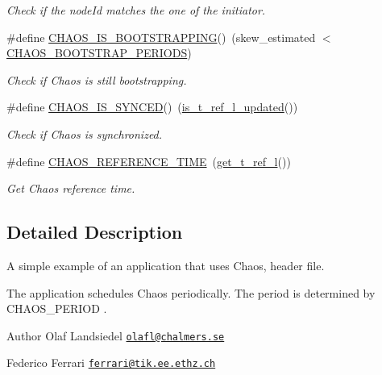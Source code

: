 \begin{DoxyCompactItemize}
\begin{DoxyCompactList}\small\item\em Check if the node\-Id matches the one of the initiator. \end{DoxyCompactList}\item 
\#define \hyperlink{group__chaos-test-defines_gad93c921ab7f327f23c1ba985a0f33c1a}{C\-H\-A\-O\-S\-\_\-\-I\-S\-\_\-\-B\-O\-O\-T\-S\-T\-R\-A\-P\-P\-I\-N\-G}()~(skew\-\_\-estimated $<$ \hyperlink{group__chaos-test-settings_ga115f8d5d589cf7d28c1a67902105c766}{C\-H\-A\-O\-S\-\_\-\-B\-O\-O\-T\-S\-T\-R\-A\-P\-\_\-\-P\-E\-R\-I\-O\-D\-S})
\begin{DoxyCompactList}\small\item\em Check if Chaos is still bootstrapping. \end{DoxyCompactList}\item 
\#define \hyperlink{group__chaos-test-defines_ga8953d1c8a6ef4556adfaf81253f98fc7}{C\-H\-A\-O\-S\-\_\-\-I\-S\-\_\-\-S\-Y\-N\-C\-E\-D}()~(\hyperlink{group__chaos__sync_gae7e475746ec86ae6dd8ca9ece642faf8}{is\-\_\-t\-\_\-ref\-\_\-l\-\_\-updated}())
\begin{DoxyCompactList}\small\item\em Check if Chaos is synchronized. \end{DoxyCompactList}\item 
\#define \hyperlink{group__chaos-test-defines_ga034934dede09c474ca85417c4794cb51}{C\-H\-A\-O\-S\-\_\-\-R\-E\-F\-E\-R\-E\-N\-C\-E\-\_\-\-T\-I\-M\-E}~(\hyperlink{group__chaos__sync_gaa37a5474c90f7747d0f5054dc1a03764}{get\-\_\-t\-\_\-ref\-\_\-l}())
\begin{DoxyCompactList}\small\item\em Get Chaos reference time. \end{DoxyCompactList}\end{DoxyCompactItemize}


\subsection{Detailed Description}
\begin{DoxyVerb}    A simple example of an application that uses Chaos, header file.

    The application schedules Chaos periodically.
    The period is determined by \link CHAOS_PERIOD \endlink.
\end{DoxyVerb}
 \begin{DoxyAuthor}{Author}
Olaf Landsiedel \href{mailto:olafl@chalmers.se}{\tt olafl@chalmers.\-se} 

Federico Ferrari \href{mailto:ferrari@tik.ee.ethz.ch}{\tt ferrari@tik.\-ee.\-ethz.\-ch} 
\end{DoxyAuthor}
